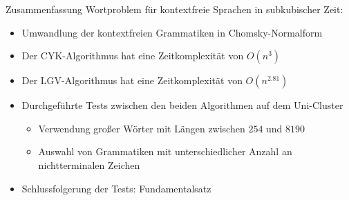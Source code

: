 \documentclass{beamer}
\begin{document}
	\begin{frame}{Zusammenfassung}
		Wortproblem für kontextfreie Sprachen in subkubischer Zeit:
		\pause
		\begin{itemize}
			\item Umwandlung der kontextfreien Grammatiken in Chomsky-Normalform
			\pause
			\item Der CYK-Algorithmus hat eine Zeitkomplexität von $O(n^{3})$
			\pause
			\item Der LGV-Algorithmus hat eine Zeitkomplexität von $O(n^{2.81})$
			\pause
			\item Durchgeführte Tests zwischen den beiden Algorithmen auf dem Uni-Cluster
			\pause
			\begin{itemize}
				\item Verwendung großer Wörter mit Längen zwischen $254$ und $8190$
				\item Auswahl von Grammatiken mit unterschiedlicher Anzahl an nichtterminalen Zeichen
			\end{itemize}
			\pause
			\item Schlussfolgerung der Tests: Fundamentalsatz
		\end{itemize}
	\end{frame}

%			
%			
%			
\end{document}
